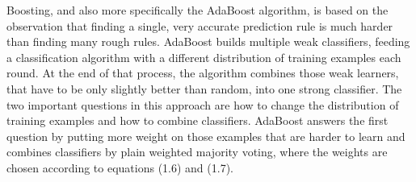 \documentclass[a4paper,12pt,times,numbered,print,index]{Classes/PhDThesisPSnPDF}
\begin{document}
Boosting, and also more specifically the AdaBoost algorithm, is based on the observation that
finding a single, very accurate prediction rule is much harder than finding many rough rules.
AdaBoost builds multiple weak classifiers, feeding a classification algorithm with a different
distribution of training examples each round. At the end of that process, the algorithm
combines those weak learners, that have to be only slightly better than random, into one
strong classifier.
The two important questions in this approach are how to change the distribution of
training examples and how to combine classifiers. AdaBoost answers the first question by
putting more weight on those examples that are harder to learn and combines classifiers by
plain weighted majority voting, where the weights are chosen according to equations (1.6)
and (1.7).



\begin{spacing}{0.9}


\cleardoublepage

\end{spacing}


\begin{appendices} %

\end{appendices}

\printthesisindex %
\end{document}
